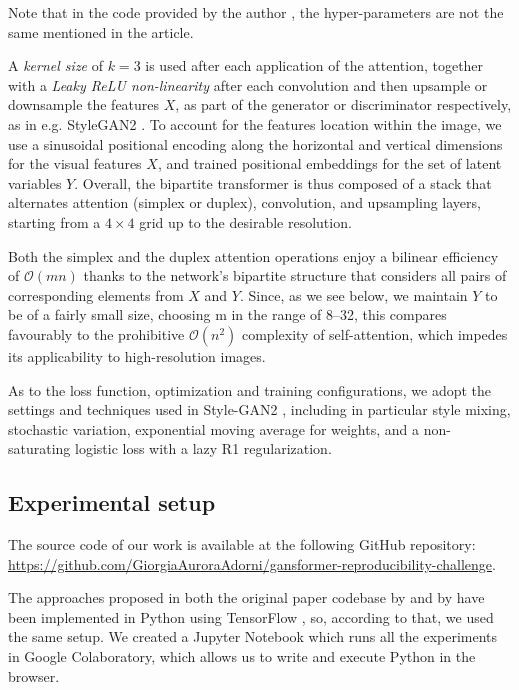 \documentclass{article}
\begin{document}
	Note that in the code provided by the author \cite{hudson2021generative}, the hyper-parameters are 
	not the same mentioned in the article. 
	
	A \textit{kernel size} of $k = 3$ is used after each application of the attention, together with a 
	\textit{Leaky ReLU non-linearity} after each convolution and then upsample or downsample the 
	features $X$, as part of the generator or discriminator respectively, as in e.g. StyleGAN2 
	\cite{karras2020analyzing}. 
	To account for the features location within the image, we use a sinusoidal positional encoding along 
	the horizontal and vertical dimensions for the visual features $X$, and trained positional 
	embeddings for the set of latent variables $Y$.
	Overall, the bipartite transformer is thus composed of a stack that alternates attention (simplex or 
	duplex), convolution, and upsampling layers, starting from a $4 \times 4$ grid up to the desirable 
	resolution. 
	
	Both the simplex and the duplex attention operations enjoy a bilinear efficiency of 
	$\mathcal{O}(mn)$ thanks to the network’s bipartite structure that considers all pairs of 
	corresponding elements from $X$ and $Y$. Since, as we see below, we maintain $Y$ to be of a fairly 
	small size, choosing m in the range of 8–32, this compares favourably to the prohibitive 	
	$\mathcal{O}(n^2)$  complexity of self-attention, which impedes its applicability to high-resolution 
	images.
	
	As to the loss function, optimization and training configurations, we adopt the settings and 
	techniques used in Style-GAN2 \cite{karras2020analyzing}, including in particular style mixing, 
	stochastic variation, exponential moving average for weights, and a non-saturating logistic loss with 
	a lazy R1 regularization.
	
	\subsection{Experimental setup}	
	The source code of our work is available at the following GitHub repository: 
	\url{https://github.com/GiorgiaAuroraAdorni/gansformer-reproducibility-challenge}.
	 
	 The approaches proposed in both the original paper codebase by \citet{karras2020analyzing} and 
	 by \citet{hudson2021generative} have been implemented in Python using TensorFlow 
	 \cite{tensorflow2015-whitepaper}, so, according to that, we used the same setup.
	 We created a Jupyter Notebook which runs all the experiments in Google Colaboratory, which 
	 allows us to write and execute Python in the browser. %
	
\end{document}
